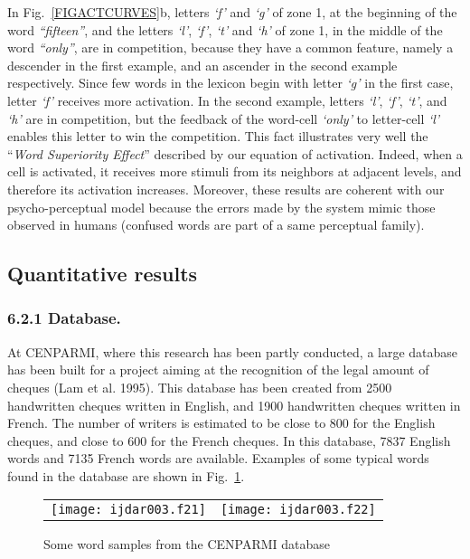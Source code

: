 \documentclass[ijdar]{svjour}
\begin{document}
In Fig.~\ref{FIGACTCURVES}b, letters {\it `f'} and {\it `g'} of zone 1, at the beginning of the word {\it ``fifteen''}, and the letters {\it `l'}, {\it `f'}, {\it `t'} and {\it `h'} of zone 1, in the middle of the word {\it ``only''}, are in competition, because they have a common feature, namely a descender in the first example, and an ascender in the second example respectively.
Since few words in the lexicon begin with letter {\it `g'} in the first case, letter {\it `f'} receives more activation.
In the second example, letters {\it `l'}, {\it `f'}, {\it `t'}, and {\it `h'} are in competition, but the feedback of the word-cell {\it `only'} to letter-cell {\it `l'} enables this letter to win the competition.
This fact illustrates very well the ``{\it Word Superiority Effect}'' described by our equation of activation.
Indeed, when a cell is activated, it receives more stimuli from its neighbors at adjacent levels, and therefore its activation increases.
Moreover, these results are coherent with our psycho-perceptual model because the errors made by the system mimic those observed in humans (confused words are part of a same perceptual family).


\subsection{Quantitative results}

\subsubsection{6.2.1 Database.}

At CENPARMI, where this research has been partly conducted, a large database has been built for a project aiming at the recognition of the
legal\break
amount of cheques (Lam et al. 1995).
This database has been created from 2500 handwritten cheques written in English, and 1900 handwritten cheques written in French.
The number of writers is estimated to be close to 800 for the English cheques, and close to 600 for the French cheques.
In this database, 7837 English words and 7135 French words are available.
Examples of some typical words found in the database are shown in Fig.~\ref{FIGSAMPLE1}.


\begin{figure}%
\hspace*{-2mm}
\tabcolsep 5pt
\begin{tabular}{c c}
\texttt{[image: ijdar003.f21]}%
&\texttt{[image: ijdar003.f22]}%
\\
\end{tabular}
\caption{Some word samples from the CENPARMI database}
\label{FIGSAMPLE1}
\end{figure}
\end{document}
